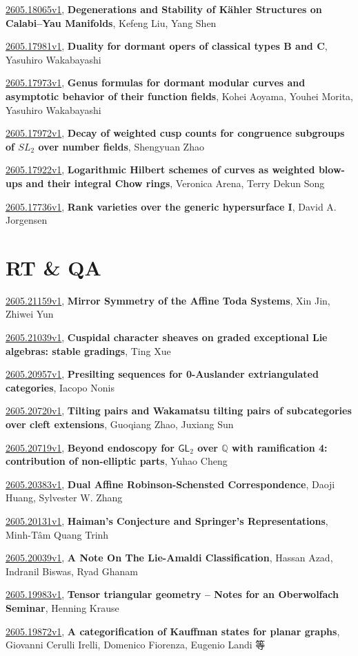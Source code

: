 \documentclass[9pt, a4paper]{article}
\theoremstyle{plain}
\theoremstyle{definition}
\theoremstyle{remark}
\newcommand{\arxiv}[3]{\href{https://arxiv.org/abs/#1}{#1}, \textbf{\textcolor{arxivblue}{#2}}, #3}
\begin{document}
\arxiv{2605.18065v1}{Degenerations and Stability of Kähler Structures on Calabi--Yau Manifolds}{Kefeng Liu, Yang Shen}

\arxiv{2605.17981v1}{Duality for dormant opers of classical types B and C}{Yasuhiro Wakabayashi}

\arxiv{2605.17973v1}{Genus formulas for dormant modular curves and asymptotic behavior of their function fields}{Kohei Aoyama, Youhei Morita, Yasuhiro Wakabayashi}

\arxiv{2605.17972v1}{Decay of weighted cusp counts for congruence subgroups of $SL_2$ over number fields}{Shengyuan Zhao}

\arxiv{2605.17922v1}{Logarithmic Hilbert schemes of curves as weighted blow-ups and their integral Chow rings}{Veronica Arena, Terry Dekun Song}

\arxiv{2605.17736v1}{Rank varieties over the generic hypersurface I}{David A. Jorgensen}


\section{RT \& QA}
\arxiv{2605.21159v1}{Mirror Symmetry of the Affine Toda Systems}{Xin Jin, Zhiwei Yun}

\arxiv{2605.21039v1}{Cuspidal character sheaves on graded exceptional Lie algebras: stable gradings}{Ting Xue}

\arxiv{2605.20957v1}{Presilting sequences for 0-Auslander extriangulated categories}{Iacopo Nonis}

\arxiv{2605.20720v1}{Tilting pairs and Wakamatsu tilting pairs of subcategories over cleft extensions}{Guoqiang Zhao, Juxiang Sun}

\arxiv{2605.20719v1}{Beyond endoscopy for $\mathsf{GL}_2$ over $\mathbb{Q}$ with ramification 4: contribution of non-elliptic parts}{Yuhao Cheng}

\arxiv{2605.20383v1}{Dual Affine Robinson-Schensted Correspondence}{Daoji Huang, Sylvester W. Zhang}

\arxiv{2605.20131v1}{Haiman's Conjecture and Springer's Representations}{Minh-Tâm Quang Trinh}

\arxiv{2605.20039v1}{A Note On The Lie-Amaldi Classification}{Hassan Azad, Indranil Biswas, Ryad Ghanam}

\arxiv{2605.19983v1}{Tensor triangular geometry -- Notes for an Oberwolfach Seminar}{Henning Krause}

\arxiv{2605.19872v1}{A categorification of Kauffman states for planar graphs}{Giovanni Cerulli Irelli, Domenico Fiorenza, Eugenio Landi 等}
\end{document}
